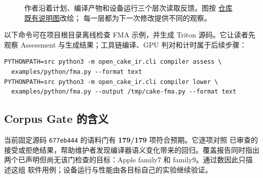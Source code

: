 \documentclass[UTF8,11pt,a4paper,fontset=none]{ctexart}
\newcommand{\code}[1]{\texttt{#1}}
\newcommand{\repo}[2]{\href{https://github.com/qhy991/open-cake-ir/blob/677eb444fec593294c470dcc5793262ae769fce2/#1}{#2}}
\begin{document}
\begin{figure}[htbp]
\centering
{}
\caption{作者沿着计划、编译产物和设备运行三个层次读取反馈。图按
\repo{docs/overview-20260918/figures/feedback_layers.png}{仓库既有说明图}改绘；
每一层都为下一次修改提供不同的观察。}
\label{fig:feedback-layers}
\end{figure}
\FloatBarrier

以下命令可在项目根目录离线检查 FMA 示例，并生成 Triton 源码。它让读者先观察
Assessment 与生成结果；工具链编译、GPU 判对和计时属于后续步骤：
\begin{lstlisting}[style=reportcode]
PYTHONPATH=src python3 -m open_cake_ir.cli compiler assess \
  examples/python/fma.py --format text
PYTHONPATH=src python3 -m open_cake_ir.cli compiler lower \
  examples/python/fma.py --output /tmp/cake-fma.py --format text
\end{lstlisting}

\subsection{Corpus Gate 的含义}
当前固定源码 \code{677eb444} 的语料门有 \textbf{179/179} 项符合预期。它逐项对照
已审查的接受或拒绝结果，帮助维护者发现编译器语义变化带来的回归。覆盖报告同时指出
两个已声明但尚无该门检查的目标：Apple family7 和 family9。通过数因此只描述这组
软件用例；设备运行与性能由各目标自己的实验继续验证\cite{status,acceptance}。
\end{document}
